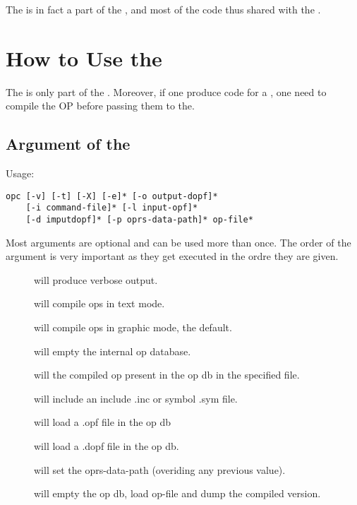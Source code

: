 The \OPC{} is in fact a part of the \CPK{}, and most of the code thus shared 
with the \CPK{}. 

\chapter{How to Use the \OPC{}}

The \OPC{} is only part of the \COPRSDE{}. Moreover, if one produce \COPRS{}
code for a \COPRSAE{}, one need to compile the OP before passing them to
the\COPRSAE{}.

\section{Argument of the \OPC{}}

Usage: \begin{verbatim}
opc [-v] [-t] [-X] [-e]* [-o output-dopf]*
    [-i command-file]* [-l input-opf]*
    [-d imputdopf]* [-p oprs-data-path]* op-file*
\end{verbatim}


Most arguments are optional and can be used more than once. The order of the 
argument is very important as they get executed in the ordre they are given.

\begin{description}

\item[] will produce verbose output.

\item[] will compile ops in text mode.

\item[] will compile ops in graphic mode, the default.

\item[] will empty the internal op database.

\item[] will  the compiled op present in the op db in
  the specified file.

\item[] will include an include .inc or symbol .sym file.

\item[] will load a .opf file in the op db

\item[] will load a .dopf file in the op db.

\item[] will set the oprs-data-path (overiding any
  previous value).

\item[] will empty the op db, load op-file and dump the compiled version.

\end{description}

